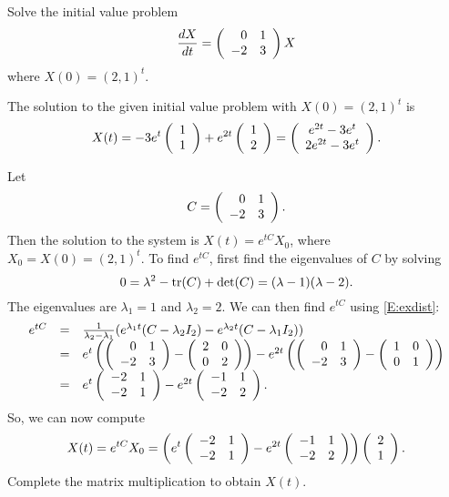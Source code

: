 \documentclass{ximera}
\begin{document}
\begin{exercise} \label{c6.6.2}
Solve the initial value problem
\[
\frac{dX}{dt} = \left(\begin{array}{rr} 0 & 1\\ -2 &3\end{array}\right) X
\]
where $X(0)=(2,1)^t$.

\begin{solution}

\ans The solution to the given initial value problem with $X(0) = (2,1)^t$
is
\[
X(t) = -3e^t\left(\begin{array}{r} 1 \\ 1\end{array}\right) + e^{2t}\left(\begin{array}{r} 1 \\ 2\end{array}\right)
= \left(\begin{array}{c} e^{2t} - 3e^t \\ 2e^{2t} - 3e^t\end{array}\right).
\]

\soln Let \[ C = \left(\begin{array}{rr} 0 & 1\\ -2 &3\end{array}\right). \]
Then the solution to the system is $X(t) = e^{tC}X_0$, where
$X_0 = X(0) = (2,1)^t$.
To find $e^{tC}$, first find the eigenvalues of $C$ by solving
\[
0 = \lambda^2 - {\rm tr}(C) + \det(C) = (\lambda - 1)(\lambda - 2).
\]
The eigenvalues are $\lambda_1 = 1$ and $\lambda_2 = 2$.  We can
then find $e^{tC}$ using \eqref{E:exdist}:
\[
\begin{array}{rcl}
e^{tC} & = & \frac{1}{\lambda_2 - \lambda_1}(e^{\lambda_1 t}(C -
\lambda_2 I_2) - e^{\lambda_2 t}(C - \lambda_1 I_2)) \\
& = & e^t\left(\left(\begin{array}{rr} 0 & 1\\ -2 &3\end{array}\right) - \left(\begin{array}{rr} 2 & 0\\ 0 &2\end{array}\right)\right) -
e^{2t}\left(\left(\begin{array}{rr} 0 & 1\\ -2 &3\end{array}\right) - \left(\begin{array}{rr} 1 & 0\\ 0 &1\end{array}\right)\right) \\
& = &
e^t\left(\begin{array}{rr} -2 & 1\\ -2 &1\end{array}\right) - e^{2t}\left(\begin{array}{rr} -1 & 1\\ -2 &2\end{array}\right).
\end{array}
\]
So, we can now compute
\[
X(t) = e^{tC}X_0
= \left(e^t\left(\begin{array}{rr} -2 & 1\\ -2 &1\end{array}\right) -
e^{2t}\left(\begin{array}{rr} -1 & 1\\ -2 &2\end{array}\right)\right)\left(\begin{array}{r} 2 \\ 1\end{array}\right).
\]
Complete the matrix multiplication to obtain $X(t)$.

\end{solution}
\end{exercise}
\end{document}
